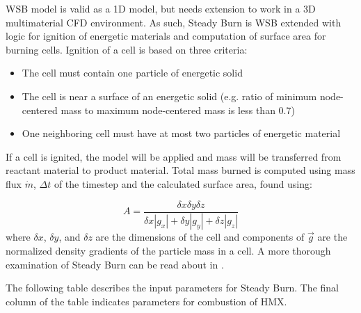WSB model is valid as a 1D model, but needs extension to work in a 3D multimaterial CFD environment.  As such, Steady Burn is WSB extended with logic for ignition of energetic materials and computation of surface area for burning cells.  Ignition of a cell is based on three criteria: 
\begin{itemize}
  \item The cell must contain one particle of energetic solid
  \item The cell is near a surface of an energetic solid (e.g. ratio of minimum node-centered mass to maximum node-centered mass is less than 0.7)
  \item One neighboring cell must have at most two particles of energetic material
\end{itemize}
If a cell is ignited, the model will be applied and mass will be transferred from reactant material to product material.  Total mass burned is computed using mass flux $\dot{m}$, $\Delta t$ of the timestep and the calculated surface area, found using:

\begin{equation}
A=\frac{\delta x \delta y \delta z}{\displaystyle \delta x |g_x| + \delta y |g_y| + \delta z |g_z|}
\label{WSB6}
\end{equation} where $\delta x$, $\delta y$, and $\delta z$ are the dimensions of the cell and components of $\overrightarrow{g}$ are the normalized density gradients of the particle mass in a cell.  A more thorough examination of Steady Burn can be read about in \cite{ref:wighteddings}.

The following table describes the input parameters for Steady Burn.  The final column of the table indicates parameters for combustion of HMX.  

